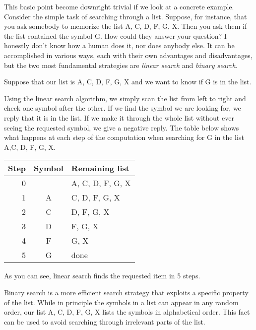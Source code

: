 This basic point become downright trivial if we look at a concrete example.
Consider the simple task of searching through a list.
Suppose, for instance, that you ask somebody to memorize the list A, C, D, F, G, X\@.
Then you ask them if the list contained the symbol G\@.
How could they answer your question?
I honestly don't know how a human does it, nor does anybody else.
It can be accomplished in various ways, each with their own advantages and disadvantages, but the two most fundamental strategies are \emph{linear search} and \emph{binary search}.
%
\begin{examplebox}
    Suppose that our list is A, C, D, F, G, X and we want to know if G is in the list.

    Using the linear search algorithm, we simply scan the list from left to right and check one symbol after the other.
    If we find the symbol we are looking for, we reply that it is in the list.
    If we make it through the whole list without ever seeing the requested symbol, we give a negative reply.
    The table below shows what happens at each step of the computation when searching for G in the list A,C, D, F, G, X\@.
    \begin{center}
        \begin{tabular}{rcl}
            \toprule
            \textbf{Step} & \textbf{Symbol} & \textbf{Remaining list}\\
            \midrule
            0 &   & A, C, D, F, G, X\\
            1 & A & C, D, F, G, X\\
            2 & C & D, F, G, X\\
            3 & D & F, G, X\\
            4 & F & G, X\\
            5 & G & done\\
            \bottomrule
        \end{tabular}
    \end{center}
    As you can see, linear search finds the requested item in 5 steps.

    Binary search is a more efficient search strategy that exploits a specific property of the list.
    While in principle the symbols in a list can appear in any random order, our list A, C, D, F, G, X lists the symbols in alphabetical order.
    This fact can be used to avoid searching through irrelevant parts of the list.


\end{examplebox}
